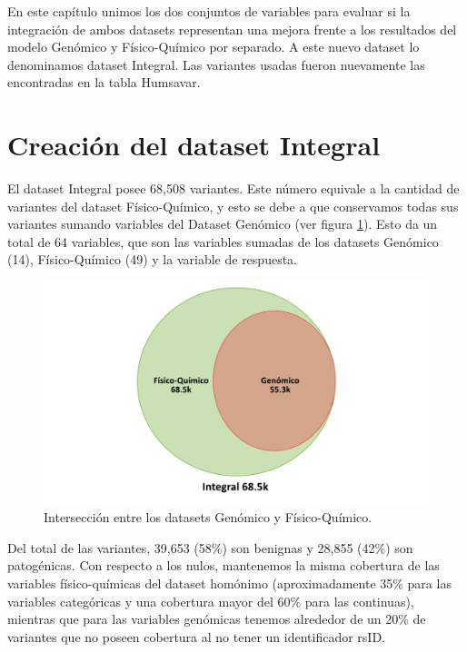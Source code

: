 
En este capítulo unimos los dos conjuntos de variables para evaluar si la integración de ambos datasets representan una mejora frente a los resultados del modelo Genómico y Físico-Químico por separado. A este nuevo dataset lo denominamos dataset Integral. Las variantes usadas fueron nuevamente las encontradas en la tabla Humsavar. 

\section{Creación del dataset Integral}

El dataset Integral posee 68,508 variantes. Este número equivale a la cantidad de variantes del dataset Físico-Químico, y esto se debe a que conservamos todas sus variantes sumando variables del Dataset Genómico (ver figura \ref{fig:interseccion_integral}). Esto da un total de 64 variables, que son las variables sumadas de los datasets Genómico (14), Físico-Químico (49) y la variable de respuesta.  

\begin{figure}[H]
    \centering
    \includegraphics[scale=0.6]{documents/latex/figures/3/integral/interseccion_integral.pdf}
    \caption{Intersección entre los datasets Genómico y Físico-Químico.}
    \label{fig:interseccion_integral}
\end{figure}

Del total de las variantes, 39,653 (58\%) son benignas y 28,855 (42\%) son patogénicas. Con respecto a los nulos, mantenemos la misma cobertura de las variables físico-químicas del dataset homónimo (aproximadamente 35\% para las variables categóricas y una cobertura mayor del 60\% para las continuas), mientras que para las variables genómicas tenemos alrededor de un 20\% de variantes que no poseen cobertura al no tener un identificador rsID.

